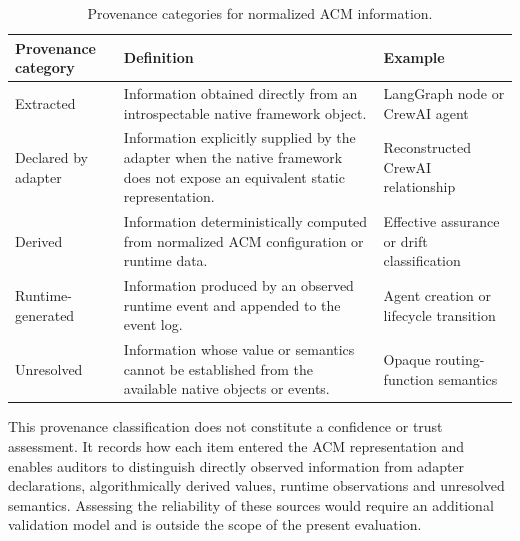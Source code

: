 \documentclass[10pt]{article}
\begin{document}
\begin{table}[t]
\centering
\caption{Provenance categories for normalized ACM information.}
\label{tab:information_provenance}
\begin{tabularx}{\linewidth}{lXX}
\toprule
Provenance category &
Definition &
Example \\
\midrule

Extracted &
Information obtained directly from an introspectable native framework object. &
LangGraph node or CrewAI agent \\

Declared by adapter &
Information explicitly supplied by the adapter when the native framework does not expose an equivalent static representation. &
Reconstructed CrewAI relationship \\

Derived &
Information deterministically computed from normalized ACM configuration or runtime data. &
Effective assurance or drift classification \\

Runtime-generated &
Information produced by an observed runtime event and appended to the event log. &
Agent creation or lifecycle transition \\

Unresolved &
Information whose value or semantics cannot be established from the available native objects or events. &
Opaque routing-function semantics \\

\bottomrule
\end{tabularx}
\end{table}
This provenance classification does not constitute a confidence or trust
assessment. It records how each item entered the ACM representation and enables
auditors to distinguish directly observed information from adapter declarations,
algorithmically derived values, runtime observations and unresolved semantics.
Assessing the reliability of these sources would require an additional
validation model and is outside the scope of the present evaluation.
\end{document}
